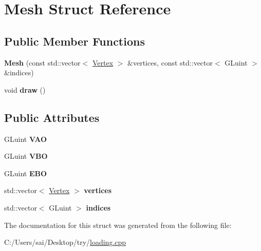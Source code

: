 \hypertarget{struct_mesh}{}\section{Mesh Struct Reference}
\label{struct_mesh}
\subsection*{Public Member Functions}
\begin{DoxyCompactItemize}
\item 
\mbox{\label{struct_mesh_abf0f7e995565ce86a2beb1a52276b44d}} 
{\bfseries Mesh} (const std\+::vector$<$ \mbox{\hyperlink{struct_vertex}{Vertex}} $>$ \&vertices, const std\+::vector$<$ G\+Luint $>$ \&indices)
\item 
\mbox{\label{struct_mesh_a996a8668fa2ca7d95d6d10744c833bc8}} 
void {\bfseries draw} ()
\end{DoxyCompactItemize}
\subsection*{Public Attributes}
\begin{DoxyCompactItemize}
\item 
\mbox{\label{struct_mesh_a09b989b9d4df8ae595d7e80e091a4a5b}} 
G\+Luint {\bfseries V\+AO}
\item 
\mbox{\label{struct_mesh_a0d28b2c6fee628a13f43cae3f858569b}} 
G\+Luint {\bfseries V\+BO}
\item 
\mbox{\label{struct_mesh_a894c6723c0172f4e38b2509582abfa6c}} 
G\+Luint {\bfseries E\+BO}
\item 
\mbox{\label{struct_mesh_a6465a888c97232a39e12aad008c969c3}} 
std\+::vector$<$ \mbox{\hyperlink{struct_vertex}{Vertex}} $>$ {\bfseries vertices}
\item 
\mbox{\label{struct_mesh_a5e55b84c6c967608bcf23ed7d68e4215}} 
std\+::vector$<$ G\+Luint $>$ {\bfseries indices}
\end{DoxyCompactItemize}


The documentation for this struct was generated from the following file\+:\begin{DoxyCompactItemize}
\item 
C\+:/\+Users/sai/\+Desktop/try/\mbox{\hyperlink{loading_8cpp}{loading.\+cpp}}\end{DoxyCompactItemize}
